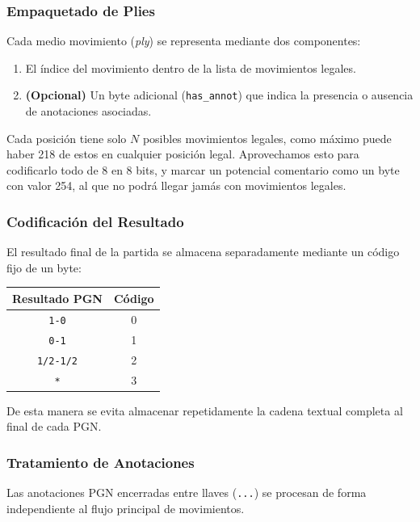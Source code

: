 \documentclass[11pt, letterpaper]{article}
\begin{document}
\subsubsection{Empaquetado de Plies}

Cada medio movimiento (\textit{ply}) se representa mediante dos componentes:

\begin{enumerate}
\item El índice del movimiento dentro de la lista de movimientos legales.
\item \textbf{(Opcional)} Un byte adicional (\texttt{has\_annot}) que indica la presencia o ausencia de anotaciones asociadas.
\end{enumerate}

Cada posición tiene solo $N$ posibles movimientos legales, como máximo puede haber 218 de estos en cualquier posición legal.
Aprovechamos esto para codificarlo todo de 8 en 8 bits, y marcar un potencial comentario como un byte con valor 254, al que no podrá llegar jamás con movimientos legales.

\subsubsection{Codificación del Resultado}

El resultado final de la partida se almacena separadamente mediante un código fijo de un byte:

\begin{center}
\begin{tabular}{cc}
\hline
Resultado PGN & Código \\
\hline
\texttt{1-0} & 0 \\
\texttt{0-1} & 1 \\
\texttt{1/2-1/2} & 2 \\
\texttt{*} & 3 \\
\hline
\end{tabular}
\end{center}

De esta manera se evita almacenar repetidamente la cadena textual completa al final de cada PGN.

\subsubsection{Tratamiento de Anotaciones}

Las anotaciones PGN encerradas entre llaves (\texttt{{...}}) se procesan de forma independiente al flujo principal de movimientos.
\end{document}
